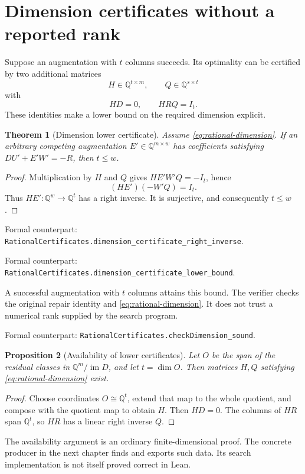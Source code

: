 \documentclass[11pt,letterpaper,oneside,openany]{book}
\theoremstyle{quiet}
\newtheorem{theorem}{Theorem}[chapter]
\newtheorem{proposition}[theorem]{Proposition}
\newcommand{\Q}{\mathbb{Q}}
\DeclareMathOperator{\im}{im}
\newcommand{\formal}[1]{\par\nobreak\begingroup\footnotesize\color{Slate}\sffamily Formal counterpart: \normalfont\nolinkurl{#1}.\par\endgroup}
\newcommand{\sourcescope}[1]{\par\begingroup\small\color{Slate}#1\par\endgroup}
\begin{document}
\section{Dimension certificates without a reported rank}
Suppose an augmentation with $t$ columns succeeds. Its optimality can be certified by two additional matrices
\[
 H\in\Q^{t\times m},\qquad Q\in\Q^{s\times t}
\]
with
\begin{equation}\label{eq:rational-dimension}
 HD=0,\qquad HRQ=I_t.
\end{equation}
These identities make a lower bound on the required dimension explicit.

\begin{theorem}[Dimension lower certificate]\label{thm:rational-lower}
Assume \eqref{eq:rational-dimension}. If an arbitrary competing augmentation $E'\in\Q^{m\times w}$ has coefficients satisfying $DU'+E'W'=-R$, then $t\leq w$.
\end{theorem}
\begin{proof}
Multiplication by $H$ and $Q$ gives $HE'W'Q=-I_t$, hence
\[
 (HE')(-W'Q)=I_t.
\]
Thus $HE':\Q^w\to\Q^t$ has a right inverse. It is surjective, and consequently $t\leq w$.
\end{proof}
\formal{RationalCertificates.dimension_certificate_right_inverse}
\formal{RationalCertificates.dimension_certificate_lower_bound}

A successful augmentation with $t$ columns attains this bound. The verifier checks the original repair identity and \eqref{eq:rational-dimension}. It does not trust a numerical rank supplied by the search program.
\formal{RationalCertificates.checkDimension_sound}

\begin{proposition}[Availability of lower certificates]
Let $O$ be the span of the residual classes in $\Q^m/\im D$, and let $t=\dim O$. Then matrices $H,Q$ satisfying \eqref{eq:rational-dimension} exist.
\end{proposition}
\begin{proof}
Choose coordinates $O\cong\Q^t$, extend that map to the whole quotient, and compose with the quotient map to obtain $H$. Then $HD=0$. The columns of $HR$ span $\Q^t$, so $HR$ has a linear right inverse $Q$.
\end{proof}
\sourcescope{The availability argument is an ordinary finite-dimensional proof. The concrete producer in the next chapter finds and exports such data. Its search implementation is not itself proved correct in Lean.}
\end{document}
